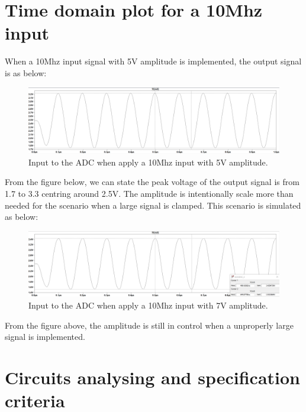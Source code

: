 \documentclass[pdftex,12pt,a4paper]{article}
\begin{document}
\section{Time domain plot for a 10Mhz input}
When a 10Mhz input signal with 5V amplitude is implemented, the output signal is as below:
\begin{figure}[H]
\centering
\includegraphics[width=16cm]{10M.png}
\caption{Input to the ADC when apply a 10Mhz input with 5V amplitude.}
\end{figure}
From the figure below, we can state the peak voltage of the output signal is from 1.7 to 3.3 centring around 2.5V. The amplitude is intentionally scale more than needed for the scenario when a large signal is clamped. This scenario is simulated as below:
\begin{figure}[H]
\centering
\includegraphics[width=16cm]{10M2.png}
\caption{Input to the ADC when apply a 10Mhz input with 7V amplitude.}
\end{figure}
From the figure above, the amplitude is still in control when a unproperly large signal is implemented.
\section{Circuits analysing and specification criteria}
\end{document}
